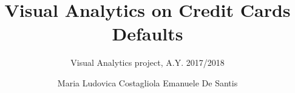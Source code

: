 \documentclass{vldb}
\begin{document}

\title{Visual Analytics on Credit Cards Defaults}
\subtitle{Visual Analytics project, A.Y. 2017/2018}



%
%
%
%


\author{
%
%
\alignauthor
Maria Ludovica Costagliola
\alignauthor
Emanuele De Santis
}
\end{document}
